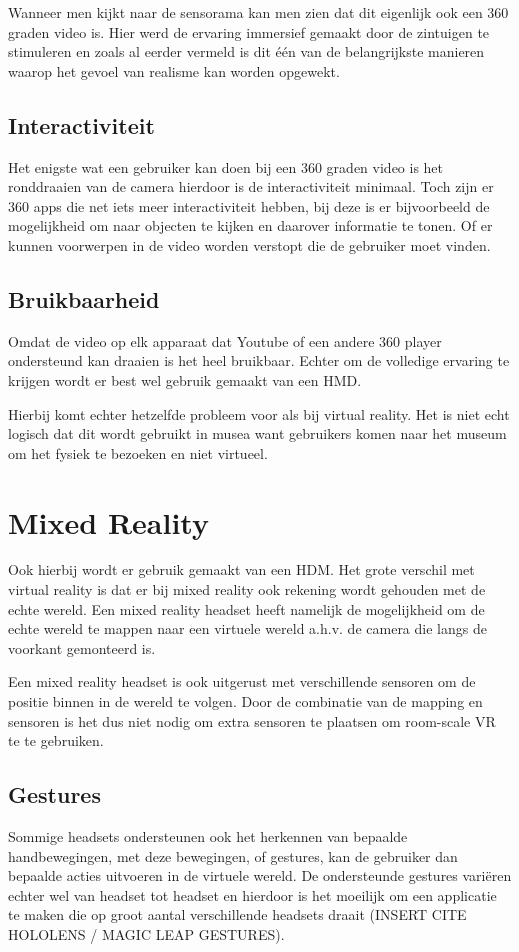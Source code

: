 Wanneer men kijkt naar de sensorama kan men zien dat dit eigenlijk ook een 360 graden video is. Hier werd de ervaring immersief gemaakt door de zintuigen te stimuleren en zoals al eerder vermeld is dit één van de belangrijkste manieren waarop het gevoel van realisme kan worden opgewekt.

\subsection{Interactiviteit}
Het enigste wat een gebruiker kan doen bij een 360 graden video is het ronddraaien van de camera hierdoor is de interactiviteit minimaal. Toch zijn er 360 apps die net iets meer interactiviteit hebben, bij deze is er bijvoorbeeld de mogelijkheid om naar objecten te kijken en daarover informatie te tonen. Of er kunnen voorwerpen in de video worden verstopt die de gebruiker moet vinden. 
\subsection{Bruikbaarheid}
Omdat de video op elk apparaat dat Youtube of een andere 360 player ondersteund kan draaien is het heel bruikbaar. Echter om de volledige ervaring te krijgen wordt er best wel gebruik gemaakt van een HMD.

Hierbij komt echter hetzelfde probleem voor als bij virtual reality. Het is niet echt logisch dat dit wordt gebruikt in musea want gebruikers komen naar het museum om het fysiek te bezoeken en niet virtueel.

\section{Mixed Reality} \label{sec:mixedreality}
Ook hierbij wordt er gebruik gemaakt van een HDM. Het grote verschil met virtual reality is dat er bij mixed reality ook rekening wordt gehouden met de echte wereld. Een mixed reality headset heeft namelijk de mogelijkheid om de echte wereld te mappen naar een virtuele wereld a.h.v. de camera die langs de voorkant gemonteerd is.

Een mixed reality headset is ook uitgerust met verschillende sensoren om de positie binnen in de wereld te volgen. Door de combinatie van de mapping en sensoren is het dus niet nodig om extra sensoren te plaatsen om room-scale VR te te gebruiken.

\subsection{Gestures}
Sommige headsets ondersteunen ook het herkennen van bepaalde handbewegingen, met deze bewegingen, of gestures, kan de gebruiker dan bepaalde acties uitvoeren in de virtuele wereld. De ondersteunde gestures variëren echter wel van headset tot headset en hierdoor is het moeilijk om een applicatie te maken die op groot aantal verschillende headsets draait (INSERT CITE HOLOLENS / MAGIC LEAP GESTURES).

